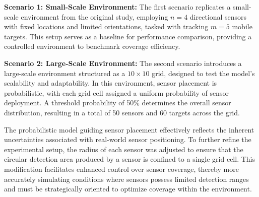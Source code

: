 \documentclass[preprint,12pt]{elsarticle}
\begin{document}
\textbf{Scenario 1: Small-Scale Environment:} The first scenario replicates a small-scale environment from the original study, employing $n = 4$ directional sensors with fixed locations and limited orientations, tasked with tracking $m = 5$ mobile targets. This setup serves as a baseline for performance comparison, providing a controlled environment to benchmark coverage efficiency.

\textbf{Scenario 2: Large-Scale Environment:} The second scenario introduces a large-scale environment structured as a $10 \times 10$ grid, designed to test the model’s scalability and adaptability. In this environment, sensor placement is probabilistic, with each grid cell assigned a uniform probability of sensor deployment. A threshold probability of 50\% determines the overall sensor distribution, resulting in a total of 50 sensors and 60 targets across the grid.

The probabilistic model guiding sensor placement effectively reflects
the inherent uncertainties associated with real-world sensor positioning. To further refine the experimental setup, the radius of each sensor was
adjusted to ensure that the circular detection area produced by a sensor is
confined to a single grid cell. This modification facilitates enhanced control
over sensor coverage, thereby more accurately simulating conditions where
sensors possess limited detection ranges and must be strategically oriented
to optimize coverage within the environment.
\end{document}
